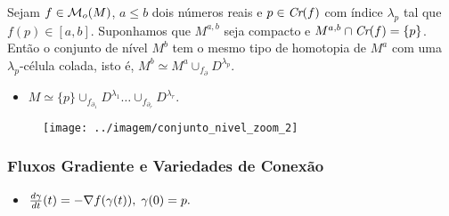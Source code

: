 \documentclass{beamer}
\begin{document}
\begin{footnotesize}
\begin{frame}
		
		\begin{teorema}
			Sejam $f\in \mathcal{M}_{o}(M)$, $a\leq b$ dois números reais e $p\in \textit{Cr}(f)$ com índice $\lambda_{p}$ tal que $f(p) \in [a,b]$. Suponhamos que $M^{a,b}$ seja compacto e $M^{a,b}\cap \textit{Cr}(f) = \{p\}$. Então o conjunto de nível $M^{b}$ tem o mesmo tipo de homotopia de $M^{a}$ com uma $\lambda_{p}$-célula colada, isto é, $M^{b} \simeq M^{a}\cup_{f_{\partial}} D^{\lambda_{p}}$.
		\end{teorema}
		
		\begin{minipage}[t]{0.5\linewidth}
			\begin{itemize}
				\item 
				$
				M \simeq \{p\}\cup_{f_{\partial_{1}}} D^{\lambda_{1}}\dots  \cup_{f_{\partial_{r}}} D^{\lambda_{r}}.
				$
			\end{itemize}
			
		\end{minipage}
		\hfil
		\begin{minipage}[t]{0.3\linewidth}
			\begin{figure}
				\centering
				\textbf{}\par
				\texttt{[image: ../imagem/conjunto\_nivel\_zoom\_2]}
			\end{figure}
			
		\end{minipage}
		
	\end{frame}
	
	\begin{frame}
		
		\frametitle{Fluxos Gradiente e Variedades de Conexão}
		
	
		\begin{minipage}[t]{0.67\linewidth}
		\begin{itemize}
			\item 	$
			\frac{d \gamma}{d t}(t) = -\nabla f(\gamma(t)), \; \gamma(0) = p.
			$
			

\end{itemize}
\end{minipage}
\end{frame}
\end{footnotesize}
\end{document}
